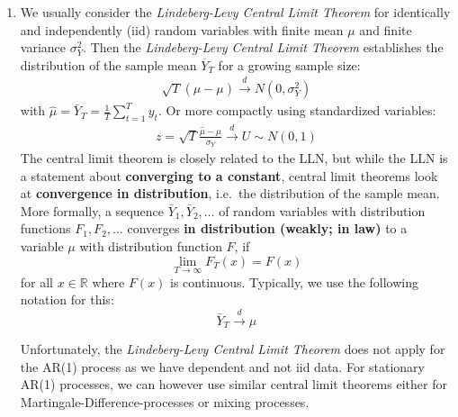 \begin{enumerate}
\item We usually consider the \emph{Lindeberg-Levy Central Limit Theorem} for identically and independently (iid) random variables
  with finite mean \( \mu \) and finite variance \(\sigma_Y^2\).
Then the \emph{Lindeberg-Levy Central Limit Theorem} establishes the distribution of the sample mean \(\overline{Y}_T\) for a growing sample size:
\begin{align*}
\sqrt{T} (\hat{\mu}-\mu) \overset{d}{\rightarrow} N(0,\sigma_Y^2)
\end{align*}
with \(\hat{\mu} = \bar{Y}_T = \frac{1}{T} \sum_{t=1}^T y_t\).
Or more compactly using standardized variables:
\begin{align*}
z = \sqrt{T}\frac{\hat{\mu}-\mu}{\sigma_Y}\overset{d}{\rightarrow} U \sim N(0,1)
\end{align*}
The central limit theorem is closely related to the LLN,
  but while the LLN is a statement about \textbf{converging to a constant},
  central limit theorems look at \textbf{convergence in distribution},
  i.e.\ the distribution of the sample mean.
More formally, a sequence \(\bar{Y}_{1},\bar{Y}_{2},\ldots \) of random variables with distribution functions
\(F_{1},F_{2},\ldots \) converges \textbf{in distribution (weakly; in law)}
to a variable \(\mu\) with distribution function \(F\), if
\begin{equation*}
\lim_{T\rightarrow \infty }F_{T}(x)=F(x)
\end{equation*}
for all \(x\in \mathbb{R}\) where \(F(x)\) is continuous.
Typically, we use the following notation for this:
\begin{equation*}
\bar{Y}_{T}\overset{d}{\rightarrow }\mu
\end{equation*}			

Unfortunately, the \emph{Lindeberg-Levy Central Limit Theorem} does not apply
  for the AR(1) process as we have dependent and not iid data.
For stationary AR(1) processes, we can however use similar central limit theorems
  either for Martingale-Difference-processes or mixing processes.
	

\end{enumerate}
